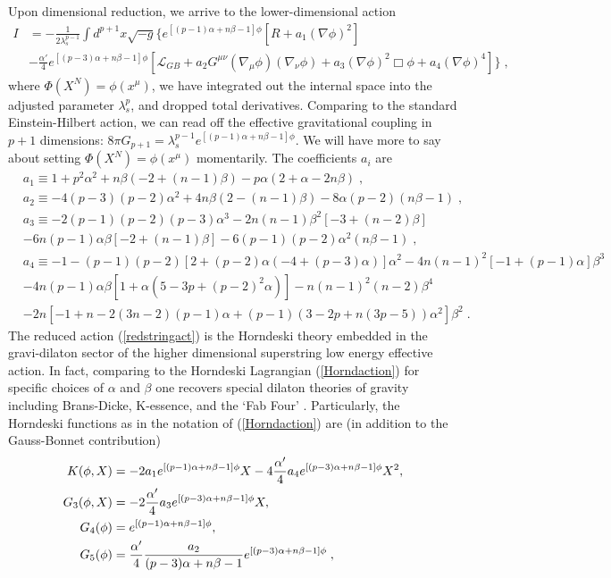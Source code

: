 \documentclass[amsmath,amssymb,11pt]{article}
\newcommand{\beq}{\begin{equation}}
\newcommand{\eeq}{\end{equation}}
\begin{document}
Upon dimensional reduction, we arrive to the lower-dimensional action \cite{Easson:2020bgk}
\beq 
\begin{split}
 I&=-\frac{1}{2\lambda^{p-1}_{s}}\int d^{p+1}x\sqrt{-g}\biggr\{e^{[(p-1)\alpha+n\beta-1]\phi}\left[R+a_{1}(\nabla\phi)^{2}\right]\\
&-\frac{\alpha'}{4}e^{[(p-3)\alpha+n\beta-1]\phi}\left[\mathcal{L}_{GB}+a_{2}G^{\mu\nu}(\nabla_{\mu}\phi)(\nabla_{\nu}\phi)+a_{3}(\nabla\phi)^{2}\Box\phi+a_{4}(\nabla\phi)^{4}\right]\biggr\}\;,
\end{split} 
\label{redstringact}\eeq
where $\Phi(X^{N})=\phi(x^{\mu})$, we have integrated out the internal space into the adjusted parameter $\lambda^{p}_{s}$, and dropped total derivatives. Comparing to the standard Einstein-Hilbert action, we can read off the effective gravitational coupling in $p+1$ dimensions: $8\pi G_{p+1}=\lambda^{p-1}_{s}e^{[(p-1)\alpha+n\beta-1]\phi}$. We will have more to say about setting $\Phi(X^{N})=\phi(x^{\mu})$ momentarily. The coefficients $a_{i}$ are 
\beq\label{ais}
\begin{split}
&a_{1}\equiv 1+p^{2}\alpha^{2}+n\beta(-2+(n-1)\beta)-p\alpha(2+\alpha-2n\beta) \;,\\
&a_{2}\equiv -4(p-3)(p-2)\alpha^{2}+4n\beta(2-(n-1)\beta)-8\alpha(p-2)(n\beta-1)\;,\\
&a_{3}\equiv-2(p-1)(p-2)(p-3)\alpha^{3}-2n(n-1)\beta^{2}[-3+(n-2)\beta]\\
&-6n(p-1)\alpha\beta[-2+(n-1)\beta]-6(p-1)(p-2)\alpha^{2}(n\beta-1)\;,\\
&a_{4}\equiv-1-(p-1)(p-2)[2+(p-2)\alpha(-4+(p-3)\alpha)]\alpha^{2}-4n(n-1)^{2}[-1+(p-1)\alpha]\beta^{3}\\
&-4n(p-1)\alpha\beta[1+\alpha(5-3p+(p-2)^{2}\alpha)]-n(n-1)^{2}(n-2)\beta^{4}\\
&-2n[-1+n-2(3n-2)(p-1)\alpha+(p-1)(3-2p+n(3p-5))\alpha^{2}]\beta^{2}\;.
\end{split}
\eeq
The reduced action (\ref{redstringact}) is the Horndeski theory embedded in the gravi-dilaton sector of the higher dimensional superstring low energy effective action. In fact, comparing to the Horndeski Lagrangian (\ref{Horndaction}) for specific choices of $\alpha$ and $\beta$ one recovers special dilaton theories of gravity including Brans-Dicke, K-essence, and the `Fab Four'  \cite{Easson:2020bgk}. Particularly, the Horndeski functions as in the notation of (\ref{Horndaction}) are (in addition to the Gauss-Bonnet contribution)
    \begin{equation}
    \begin{split}
        K(\phi,X)&=-2a_1e^{[(p-1)\alpha+n\beta-1]\phi}X-4\frac{\alpha'}{4}a_4e^{[(p-3)\alpha+n\beta-1]\phi}X^2, \\
        G_3(\phi,X)&= -2\frac{\alpha'}{4}a_3e^{[(p-3)\alpha+n\beta-1]\phi}X, \\
        G_4(\phi)&=e^{[(p-1)\alpha+n\beta-1]\phi}, \\
        G_5(\phi) &=\frac{\alpha'}{4}\frac{a_2}{(p-3)\alpha+n\beta-1}e^{[(p-3)\alpha+n\beta-1]\phi}\;,
    \end{split}
\label{eq:formfactshorn}\end{equation}
\end{document}
